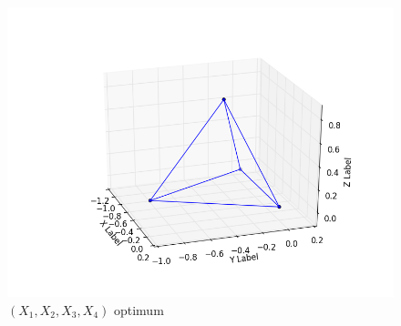 \documentclass[paper=a4, fontsize=11pt]{article}
\begin{document}
\begin{figure}
 	\begin{center}
   \includegraphics[scale=0.6]{atoms_4}
   \end{center}
   \caption{\label{étiquette4} $(X_1,X_2,X_3,X_4)$ optimum}
\end{figure}
\end{document}
